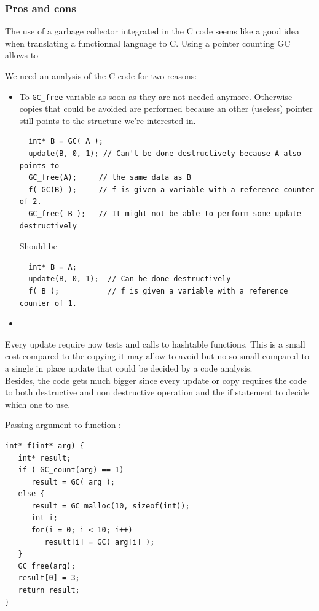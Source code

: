 \documentclass[12pt,a4paper,titlepage]{article}
\newcommand{\cl}[1]{\texttt{#1}}
\begin{document}
\subsubsection{Pros and cons}

The use of a garbage collector integrated in the C code seems like a good idea when translating a functionnal language to C. Using a pointer counting GC allows to 

We need an analysis of the C code for two reasons:
\begin{itemize}
\item To \cl{GC\_free} variable as soon as they are not needed anymore. Otherwise copies that could be avoided are performed because an other (useless) pointer still points to the structure we're interested in.
\begin{lstlisting}
  int* B = GC( A );
  update(B, 0, 1); // Can't be done destructively because A also points to
  GC_free(A);     // the same data as B
  f( GC(B) );     // f is given a variable with a reference counter of 2.
  GC_free( B );   // It might not be able to perform some update destructively
\end{lstlisting}
Should be
\begin{lstlisting}
  int* B = A;
  update(B, 0, 1);  // Can be done destructively
  f( B );           // f is given a variable with a reference counter of 1.
\end{lstlisting}
\item 
\end{itemize}

Every update require now tests and calls to hashtable functions. This is a small cost compared to the copying it may allow to avoid but no so small compared to a single in place update that could be decided by a code analysis.\\

Besides, the code gets much bigger since every update or copy requires the code to both destructive and non destructive operation and the if statement to decide which one to use.

Passing argument to function :
\begin{lstlisting}
int* f(int* arg) {
   int* result;
   if ( GC_count(arg) == 1)
      result = GC( arg );
   else {
      result = GC_malloc(10, sizeof(int));
      int i;
      for(i = 0; i < 10; i++)
         result[i] = GC( arg[i] );
   }
   GC_free(arg);
   result[0] = 3;
   return result;
}
\end{lstlisting}
\end{document}
